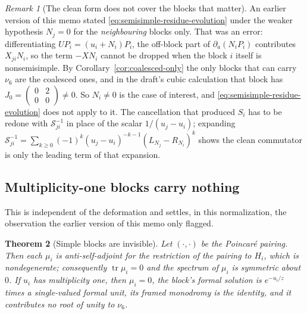 \documentclass[11pt]{article}
\newtheorem{theorem}{Theorem}
\theoremstyle{definition}
\theoremstyle{remark}
\newtheorem{remark}[theorem]{Remark}
\begin{document}
\begin{remark}[The clean form does not cover the blocks that matter]
\label{rem:sylvester-correction}
An earlier version of this memo stated \eqref{eq:semisimple-residue-evolution}
under the weaker hypothesis $N_j=0$ for the \emph{neighbouring} blocks only.
That was an error: differentiating $UP_i=(u_i+N_i)P_i$, the off-block part of
$\partial_a(N_iP_i)$ contributes $X_{ji}N_i$, so the term $-XN_i$ cannot be
dropped when the block $i$ itself is nonsemisimple. By
Corollary~\ref{cor:coalesced-only} the only blocks that can carry $\nu_6$ are
the coalesced ones, and in the draft's cubic calculation that block has
$J_0=\left(\begin{smallmatrix}0&2\\0&0\end{smallmatrix}\right)\ne0$. So
$N_i\ne0$ is the case of interest, and
\eqref{eq:semisimple-residue-evolution} does not apply to it. The cancellation
that produced $S_i$ has to be redone with $\mathcal S_{ji}^{-1}$ in place of the
scalar $1/(u_j-u_i)$; expanding
$\mathcal S_{ji}^{-1}=\sum_{k\ge0}(-1)^k(u_j-u_i)^{-k-1}(L_{N_j}-R_{N_i})^k$
shows the clean commutator is only the leading term of that expansion.
\end{remark}

\subsection*{Multiplicity-one blocks carry nothing}

This is independent of the deformation and settles, in this normalization, the
observation the earlier version of this memo only flagged.

\begin{theorem}[Simple blocks are invisible]
\label{thm:simple-blocks}
Let $(\cdot,\cdot)$ be the Poincar\'e pairing. Then each $\mu_i$ is
anti-self-adjoint for the restriction of the pairing to $H_i$, which is
nondegenerate; consequently $\operatorname{tr}\mu_i=0$ and the spectrum of
$\mu_i$ is symmetric about $0$. If $u_i$ has multiplicity one, then $\mu_i=0$,
the block's formal solution is $e^{-u_i/z}$ times a single-valued formal unit,
its framed monodromy is the identity, and it contributes no root of unity to
$\nu_6$.
\end{theorem}
\end{document}
